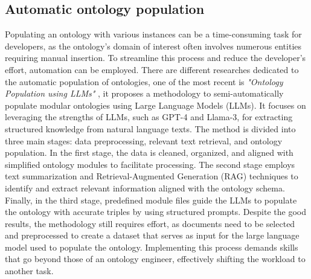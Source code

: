 \subsection{Automatic ontology population}
Populating an ontology with various instances can be a time-consuming task for developers, as the ontology's domain of interest often involves numerous entities requiring manual insertion. To streamline this process and reduce the developer's effort, automation can be employed. There are different researches dedicated to the automatic population of ontologies, one of the most recent is \textit{"Ontology Population using LLMs"} \cite{norouzi2024ontology}, it proposes a methodology to semi-automatically populate modular ontologies using Large Language Models (LLMs). It focuses on leveraging the strengths of LLMs, such as GPT-4 and Llama-3, for extracting structured knowledge from natural language texts. The method is divided into three main stages: data preprocessing, relevant text retrieval, and ontology population. In the first stage, the data is cleaned, organized, and aligned with simplified ontology modules to facilitate processing. The second stage employs text summarization and Retrieval-Augmented Generation (RAG) techniques to identify and extract relevant information aligned with the ontology schema. Finally, in the third stage, predefined module files guide the LLMs to populate the ontology with accurate triples by using structured prompts. Despite the good results, the methodology still requires effort, as documents need to be selected and preprocessed to create a dataset that serves as input for the large language model used to populate the ontology. Implementing this process demands skills that go beyond those of an ontology engineer, effectively shifting the workload to another task.\\ 
